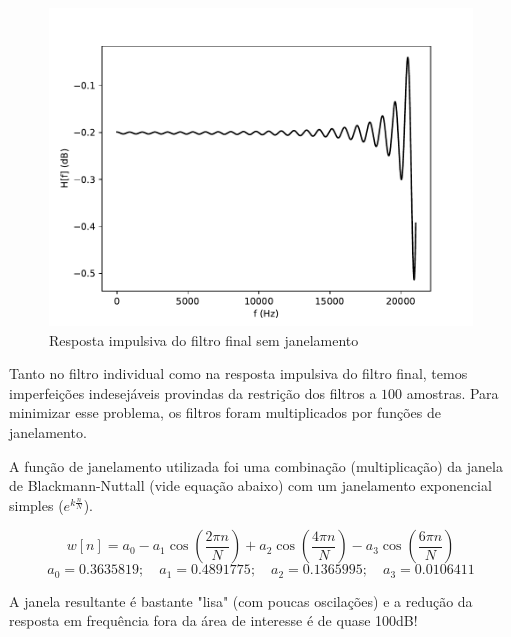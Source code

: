 \begin{figure}[H]
    \centering
    \includegraphics[scale=0.5]{fig/nowindow.pdf}
    \caption{Resposta impulsiva do filtro final sem janelamento}
    \label{fig:impulsiva nowindow}
\end{figure}

Tanto no filtro individual como na resposta impulsiva do filtro final, temos imperfeições indesejáveis provindas da restrição dos filtros a $100$ amostras. Para minimizar esse problema, os filtros foram multiplicados por funções de janelamento.

A função de janelamento utilizada foi uma combinação (multiplicação) da janela de Blackmann-Nuttall (vide equação abaixo) com um janelamento exponencial simples ($e^{k\frac{n}{N}}$).

\[
w[n]=a_0 - a_1 \cos \left ( \frac{2 \pi n}{N} \right)+ a_2 \cos \left ( \frac{4 \pi n}{N} \right)- a_3 \cos \left ( \frac{6 \pi n}{N} \right)
\]
\[
a_0=0.3635819; \quad a_1=0.4891775; \quad a_2=0.
1365995; \quad a_3=0.0106411
\]

A janela resultante é bastante "lisa" (com poucas oscilações) e a redução da resposta em frequência fora da área de interesse é de quase 100dB!

